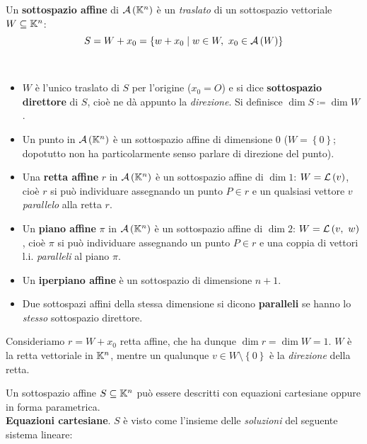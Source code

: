 \begin{define}
	Un \textbf{sottospazio affine} di ${\mathcal{A}\left(\mathbb{K}^n\right)}$ è un \textit{traslato} di un sottospazio vettoriale $W\subseteq \mathbb{K}^n$:
	\begin{equation}
		S=W+x_0=\left\{w+x_0\mid w\in W,\ x_0\in{\ensuremath{\mathcal{A}\left(W\right)}}\right\}
	\end{equation}
\end{define}
\begin{observe}~{}
	\begin{itemize}
		\item $W$ è l'unico traslato di $S$ per l'origine ($x_0=O$) e si dice \textbf{sottospazio direttore}  di $S$, cioè ne dà appunto la \textit{direzione}. Si definisce $\dim S\coloneqq\dim W$.
		\item Un punto in ${\mathcal{A}\left(\mathbb{K}^n\right)}$ è un sottospazio affine di dimensione $0$ ($W=\left\{0\right\}$; dopotutto non ha particolarmente senso parlare di direzione del punto).
		\item Una \textbf{retta affine} $r$ in ${\mathcal{A}\left(\mathbb{K}^n\right)}$ è un sottospazio affine di $\dim 1$: $W=\mathcal{L}\left(v\right)$, cioè $r$ si può individuare assegnando un punto $P\in r$ e un qualsiasi vettore $v$ \textit{parallelo} alla retta $r$.
		\item Un \textbf{piano affine} $\pi$ in ${\mathcal{A}\left(\mathbb{K}^n\right)}$ è un sottospazio affine di $\dim 2$: $W=\mathcal{L}\left(v,\ w\right)$, cioè $\pi$ si può individuare assegnando un punto $P\in r$ e una coppia di vettori l.i. \textit{paralleli} al piano $\pi$.
		\item Un \textbf{iperpiano affine} è un sottospazio di dimensione $n+1$.
		\item Due sottospazi affini della stessa dimensione si dicono \textbf{paralleli} se hanno lo \textit{stesso} sottospazio direttore.
	\end{itemize}
\end{observe}
\begin{example}
Consideriamo $r=W+x_0$ retta affine, che ha dunque $\dim r=\dim W=1$. $W$ è la retta vettoriale in $\mathbb{K}^n$, mentre un qualunque $v\in W\setminus\left\{0\right\}$ è la \textit{direzione} della retta.
\end{example}
Un sottospazio affine $S\subseteq \mathbb{K}^n$ può essere descritti con equazioni cartesiane oppure in forma parametrica.\\
	\textbf{Equazioni cartesiane}. $S$ è visto come l'insieme delle \textit{soluzioni} del seguente sistema lineare:
